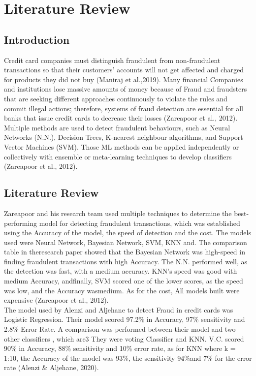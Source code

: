 
\chapter{Literature Review}
\section{ Introduction}


Credit card companies must distinguish fraudulent from non-fraudulent transactions so that 
their customers' accounts will not get affected and charged for products they did not buy (Maniraj 
et al.,2019). Many financial Companies and institutions lose massive amounts of money because 
of Fraud and fraudsters that are seeking different approaches continuously to violate the rules and 
commit illegal actions; therefore, systems of fraud detection are essential for all banks that issue 
credit cards to decrease their losses (Zareapoor et al., 2012).
Multiple methods are used to detect 
fraudulent behaviours, such  as  Neural  Networks  (N.N.),  Decision  Trees,  K-nearest  neighbour 
algorithms, and Support Vector Machines (SVM). Those ML methods can be applied independently 
or collectively with ensemble or meta-learning techniques to develop classifiers (Zareapoor et al., 
2012).





\section{ Literature Review }
Zareapoor and his research team used multiple techniques to determine the best-performing model for detecting fraudulent transactions, which was established using the Accuracy of the model, the speed of detection and the cost. The models used were Neural Network, Bayesian Network, SVM, KNN and. The comparison table in theresearch paper showed that the Bayesian Network  was  high-speed in finding  fraudulent  transactions with  high  Accuracy.  The  N.N. performed well, as the detection was fast, with a medium accuracy. KNN’s speed was good with medium Accuracy, andfinally, SVM scored one of the lower scores, as the speed was low, and the Accuracy wasmedium. As for the cost, All models built were expensive (Zareapoor et al., 2012).\cite{1}\\


The model used by Alenzi and Aljehane to detect Fraud in credit cards was Logistic Regression. Their model scored 97.2\% in Accuracy, 97\% sensitivity and 2.8\% Error Rate. A comparison was performed between their model and two other classifiers ,  which are3 They were voting Classifier and KNN. V.C. scored 90\% in Accuracy, 88\% sensitivity and 10\% error rate, as for KNN where k = 1:10, the Accuracy of the model was 93\%, the sensitivity 94\%and 
7\% for the error rate (Alenzi & Aljehane, 2020).\cite{2}\\


